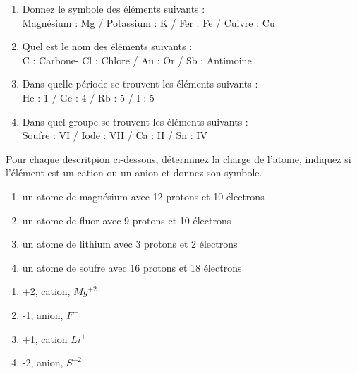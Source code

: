 \documentclass[
  11pt,
  a4paper,
  openany]{book}
\providecommand{\tightlist}{%
  \setlength{\itemsep}{0pt}\setlength{\parskip}{0pt}}
\begin{document}
\begin{Answer}

\begin{enumerate}
\def\labelenumi{\arabic{enumi}.}
\tightlist
\item
  Donnez le symbole des éléments suivants :\\
  Magnésium : Mg / Potassium : K / Fer : Fe / Cuivre : Cu
\item
  Quel est le nom des éléments suivants :\\
  C : Carbone- Cl : Chlore / Au : Or / Sb : Antimoine
\item
  Dans quelle période se trouvent les éléments suivants :\\
  He : 1 / Ge : 4 / Rb : 5 / I : 5
\item
  Dans quel groupe se trouvent les éléments suivants :\\
  Soufre : VI / Iode : VII / Ca : II / Sn : IV
\end{enumerate}

\end{Answer}

\begin{Exercise}

Pour chaque descritpion ci-dessous, déterminez la charge de l'atome, indiquez si l'élément est un cation ou un anion et donnez son symbole.

\begin{enumerate}
\def\labelenumi{\arabic{enumi}.}
\tightlist
\item
  un atome de magnésium avec 12 protons et 10 électrons\\
\item
  un atome de fluor avec 9 protons et 10 électrons\\
\item
  un atome de lithium avec 3 protons et 2 électrons\\
\item
  un atome de soufre avec 16 protons et 18 électrons
\end{enumerate}

\end{Exercise}

\begin{Answer}

\begin{enumerate}
\def\labelenumi{\arabic{enumi}.}
\tightlist
\item
  +2, cation, \(Mg^{+2}\)
\item
  -1, anion, \(F^-\)
\item
  +1, cation \(Li^+\)
\item
  -2, anion, \(S^{-2}\)
\end{enumerate}

\end{Answer}
\end{document}
